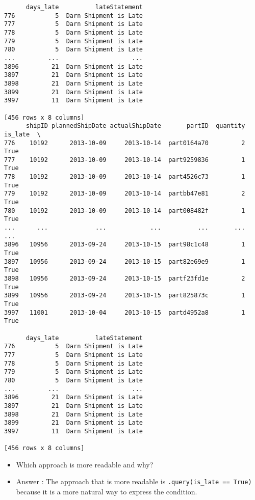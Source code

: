 \documentclass[
  letterpaper,
  DIV=11,
  numbers=noendperiod]{scrartcl}
\begin{document}
\begin{tcolorbox}
\begin{verbatim}
      days_late          lateStatement  
776           5  Darn Shipment is Late  
777           5  Darn Shipment is Late  
778           5  Darn Shipment is Late  
779           5  Darn Shipment is Late  
780           5  Darn Shipment is Late  
...         ...                    ...  
3896         21  Darn Shipment is Late  
3897         21  Darn Shipment is Late  
3898         21  Darn Shipment is Late  
3899         21  Darn Shipment is Late  
3997         11  Darn Shipment is Late  

[456 rows x 8 columns]
      shipID plannedShipDate actualShipDate       partID  quantity  is_late  \
776    10192      2013-10-09     2013-10-14  part0164a70         2     True   
777    10192      2013-10-09     2013-10-14  part9259836         1     True   
778    10192      2013-10-09     2013-10-14  part4526c73         1     True   
779    10192      2013-10-09     2013-10-14  partbb47e81         2     True   
780    10192      2013-10-09     2013-10-14  part008482f         1     True   
...      ...             ...            ...          ...       ...      ...   
3896   10956      2013-09-24     2013-10-15  part98c1c48         1     True   
3897   10956      2013-09-24     2013-10-15  part82e69e9         1     True   
3898   10956      2013-09-24     2013-10-15  partf23fd1e         2     True   
3899   10956      2013-09-24     2013-10-15  part825873c         1     True   
3997   11001      2013-10-04     2013-10-15  partd4952a8         1     True   

      days_late          lateStatement  
776           5  Darn Shipment is Late  
777           5  Darn Shipment is Late  
778           5  Darn Shipment is Late  
779           5  Darn Shipment is Late  
780           5  Darn Shipment is Late  
...         ...                    ...  
3896         21  Darn Shipment is Late  
3897         21  Darn Shipment is Late  
3898         21  Darn Shipment is Late  
3899         21  Darn Shipment is Late  
3997         11  Darn Shipment is Late  

[456 rows x 8 columns]
\end{verbatim}

\begin{itemize}
\item
  Which approach is more readable and why?
\item
  Answer : The approach that is more readable is
  \texttt{.query(\textquotesingle{}is\_late\ ==\ True\textquotesingle{})}
  because it is a more natural way to express the condition.
\end{itemize}


\end{tcolorbox}
\end{document}
